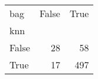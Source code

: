 \begin{tabular}{lrr}
\toprule
bag &  False &  True  \\
knn   &        &        \\
\midrule
False &     28 &     58 \\
True  &     17 &    497 \\
\bottomrule
\end{tabular}
